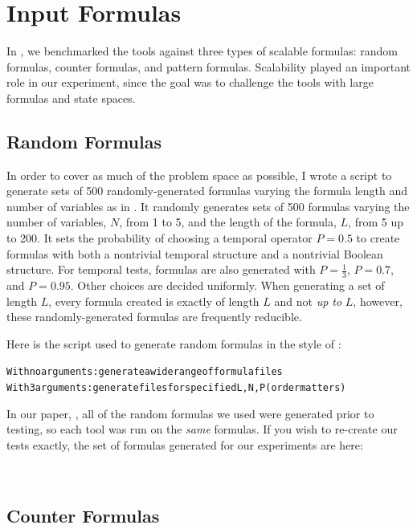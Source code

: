\documentclass{article}
\begin{document}
\section{Input Formulas}
In \cite{RV07}, we benchmarked the tools against three types of scalable formulas: random formulas, counter formulas, and pattern formulas. Scalability played an important role in our experiment, since the goal was to challenge the tools with large formulas and state spaces.

\subsection{Random Formulas}

In order to cover as much of the problem space as possible, I wrote a script to generate sets of 500 randomly-generated formulas varying the formula length and number of variables as in \cite{DGV99}. It randomly generates sets of 500 formulas varying the number of variables, $N$, from 1 to 5, and the length of the formula, $L$, from 5 up to 200. It sets the probability of choosing a temporal operator $P = 0.5$ to create formulas with both a nontrivial temporal structure and a nontrivial Boolean structure. For temporal tests, formulas are also generated with $P = \frac{1}{3}$, $P = 0.7$, and $P = 0.95$. Other choices are decided uniformly. When generating a set of length $L$, every formula created is exactly of length $L$ and not \emph{up to} $L$, however, these randomly-generated formulas are frequently reducible.

\medskip \noindent
Here is the script used to generate random formulas in the style of \cite{DGV99}:
\begin{alltt}
        With no arguments: generate a wide range of formula files
        With 3 arguments: generate files for specified L, N, P (order matters)
\end{alltt}

\medskip \noindent
In our paper, \cite{RV07}, all of the random formulas we used were generated prior to testing, so each tool was run on the \emph{same} formulas. If you wish to re-create our tests exactly, the set of formulas generated for our experiments are here:

\medskip \noindent
{}\\


\subsection{Counter Formulas}
\end{document}
